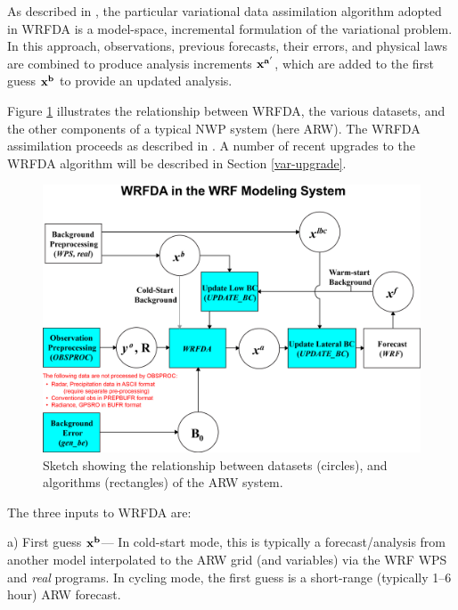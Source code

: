 As described in \citet{barker04}, the particular variational data
assimilation algorithm adopted in WRFDA is a model-space, incremental
formulation of the variational problem.  In this approach, observations,
previous forecasts, their errors, and physical laws are combined to
produce analysis increments ${\bf x^{a'}}$, which are added to the first
guess ${\bf x^{b}}$ to provide an updated analysis.

Figure \ref{var-sketch} illustrates the relationship between WRFDA,
the various datasets, and the other components of a typical NWP system
(here ARW). The WRFDA assimilation proceeds as described in
\citet{barker04}. A number of recent upgrades to the WRFDA algorithm
will be described in Section \ref{var-upgrade}.

%
%
\begin{figure}
  \centering
  \includegraphics[width=6.5in]{figures/var-sketch.pdf}
  \caption{\label{var-sketch}Sketch showing the relationship between datasets (circles), 
           and algorithms (rectangles) of the ARW system.}
\end{figure}

The three inputs to WRFDA are: 

\vspace{0.5cm}

a) First guess ${\bf x^{b}}$--- In cold-start mode, this is typically a
forecast/analysis from another model interpolated to the ARW grid (and variables) via the 
WRF WPS and {\it real} programs. In cycling mode, the first guess 
is a short-range (typically 1--6 hour) ARW forecast. 

\vspace{0.5cm}

